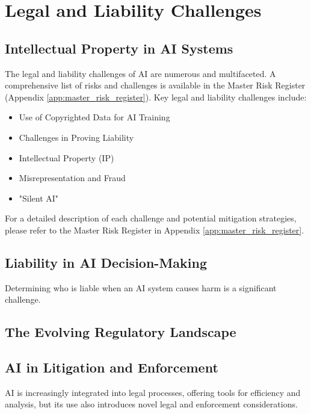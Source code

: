 \chapter{Legal and Liability Challenges}
\label{chap:legal_and_liability_challenges}

\section{Intellectual Property in AI Systems}
\label{sec:ip_in_ai}

The legal and liability challenges of AI are numerous and multifaceted. A comprehensive list of risks and challenges is available in the Master Risk Register (Appendix \ref{app:master_risk_register}). Key legal and liability challenges include:

\begin{itemize}
    \item Use of Copyrighted Data for AI Training
    \item Challenges in Proving Liability
    \item Intellectual Property (IP)
    \item Misrepresentation and Fraud
    \item "Silent AI"
\end{itemize}

For a detailed description of each challenge and potential mitigation strategies, please refer to the Master Risk Register in Appendix \ref{app:master_risk_register}.

\section{Liability in AI Decision-Making}
\label{sec:liability_in_ai}

Determining who is liable when an AI system causes harm is a significant challenge. 

\section{The Evolving Regulatory Landscape}
\label{sec:regulatory_landscape}

\section{AI in Litigation and Enforcement}
\label{sec:ai_in_litigation}

AI is increasingly integrated into legal processes, offering tools for efficiency and analysis, but its use also introduces novel legal and enforcement considerations. 

